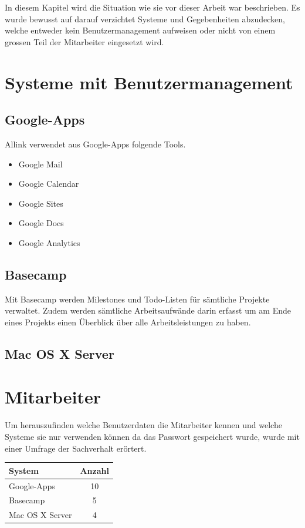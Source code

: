 In diesem Kapitel wird die Situation wie sie vor dieser Arbeit war beschrieben.
Es wurde bewusst auf darauf verzichtet Systeme und Gegebenheiten abzudecken,
welche entweder kein Benutzermanagement aufweisen oder nicht von einem grossen
Teil der Mitarbeiter eingesetzt wird.

\section{Systeme mit Benutzermanagement}
\label{sec:Systeme mit Benutzermanagement}

\subsection{Google-Apps}
\label{subs:Google-Apps}
Allink verwendet aus Google-Apps folgende Tools. 
\begin{itemize}
	\item Google Mail 
	\item Google Calendar 
	\item Google Sites 
	\item Google Docs 
	\item Google Analytics 
\end{itemize}

\subsection{Basecamp}
\label{subs:Basecamp}
Mit Basecamp werden Milestones und Todo-Listen für sämtliche Projekte
verwaltet. Zudem werden sämtliche Arbeitsaufwände darin erfasst um am Ende
eines Projekts einen Überblick über alle Arbeitsleistungen zu haben.

\subsection{Mac OS X Server}
\label{subs:Mac OS X Server}

\section{Mitarbeiter}
\label{sec:Mitarbeiter}
Um herauszufinden welche Benutzerdaten die Mitarbeiter kennen und welche
Systeme sie nur verwenden können da das Passwort gespeichert wurde, wurde
mit einer Umfrage der Sachverhalt erörtert.

\begin{tabular}
	{|l | c|} \hline System & Anzahl\\
	\hline Google-Apps & 10\\
	\hline Basecamp & 5\\
	\hline Mac OS X Server & 4\\
	\hline 
\end{tabular}

